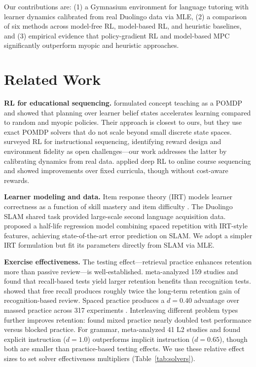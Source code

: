 \documentclass{article}
\begin{document}
Our contributions are: (1) a Gymnasium environment for language tutoring with learner dynamics calibrated from real Duolingo data via MLE, (2) a comparison of six methods across model-free RL, model-based RL, and heuristic baselines, and (3) empirical evidence that policy-gradient RL and model-based MPC significantly outperform myopic and heuristic approaches.

\section{Related Work}

\textbf{RL for educational sequencing.}
\citet{rafferty2016pomdp} formulated concept teaching as a POMDP and showed that planning over learner belief states accelerates learning compared to random and myopic policies. Their approach is closest to ours, but they use exact POMDP solvers that do not scale beyond small discrete state spaces. \citet{doroudi2019tutoring} surveyed RL for instructional sequencing, identifying reward design and environment fidelity as open challenges---our work addresses the latter by calibrating dynamics from real data. \citet{raffelsberger2022survey} applied deep RL to online course sequencing and showed improvements over fixed curricula, though without cost-aware rewards.

\textbf{Learner modeling and data.}
Item response theory (IRT) models learner correctness as a function of skill mastery and item difficulty \citep{embretson2013irt}. The Duolingo SLAM shared task \citep{duolingo2018slam} provided large-scale second language acquisition data. \citet{settles2018slam} proposed a half-life regression model combining spaced repetition with IRT-style features, achieving state-of-the-art error prediction on SLAM. We adopt a simpler IRT formulation but fit its parameters directly from SLAM via MLE.

\textbf{Exercise effectiveness.}
The testing effect---retrieval practice enhances retention more than passive review---is well-established. \citet{rowland2014testing} meta-analyzed 159 studies and found that recall-based tests yield larger retention benefits than recognition tests. \citet{roediger2006power} showed that free recall produces roughly twice the long-term retention gain of recognition-based review. Spaced practice produces a $d = 0.40$ advantage over massed practice across 317 experiments \citep{cepeda2006spacing}. Interleaving different problem types further improves retention: \citet{rohrer2007interleaving} found mixed practice nearly doubled test performance versus blocked practice. For grammar, \citet{spada2010explicit} meta-analyzed 41 L2 studies and found explicit instruction ($d = 1.0$) outperforms implicit instruction ($d = 0.65$), though both are smaller than practice-based testing effects. We use these relative effect sizes to set solver effectiveness multipliers (Table~\ref{tab:solvers}).
\end{document}
